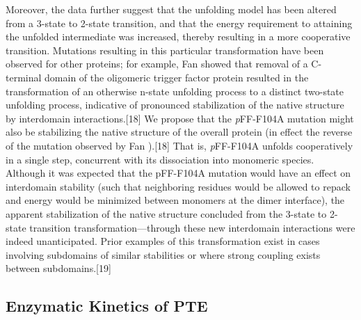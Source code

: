\begin{refsection}
Moreover, the data further suggest that the unfolding model has been altered
from a 3-state to 2-state transition, and that the energy requirement to
attaining the unfolded intermediate was increased, thereby resulting in a more
cooperative transition. Mutations resulting in this particular transformation
have been observed for other proteins; for example, Fan  showed
that removal of a C-terminal domain of the oligomeric  trigger
factor protein resulted in the transformation of an otherwise n-state unfolding
process to a distinct two-state unfolding process, indicative of pronounced
stabilization of the native structure by interdomain interactions.[18] We
propose that the \emph{p}FF-F104A mutation might also be stabilizing the native
structure of the overall protein (in effect the reverse of the mutation
observed by Fan ).[18] That is, \emph{p}FF-F104A unfolds
cooperatively in a single step, concurrent with its dissociation into monomeric
species. Although it was expected that the pFF-F104A mutation would have an
effect on interdomain stability (such that neighboring residues would be
allowed to repack and energy would be minimized between monomers at the dimer
interface), the apparent stabilization of the native structure concluded from
the 3-state to 2-state transition transformation—through these new interdomain
interactions were indeed unanticipated. Prior examples of this transformation
exist in cases involving subdomains of similar stabilities or where strong
coupling exists between subdomains.[19]

\subsection{Enzymatic Kinetics of PTE}


\end{refsection}
